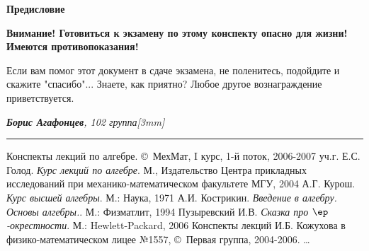 {
 \renewcommand{\baselinestretch}{1.25}
 
 \bfseries\Large Предисловие\par\bigskip
 \mdseries\normalsize
 
 


\vskip10mm
\begin{center}
{\color{red}\bf Внимание! Готовиться к экзамену по этому конспекту опасно
  для жизни! Имеются противопоказания!}
\end{center} 

\vskip20mm
\begin{flushright}
Если вам помог этот документ в сдаче экзамена, не поленитесь, подойдите и скажите "спасибо"... 
Знаете, как приятно? Любое другое вознаграждение приветствуется.
\end{flushright}
 
 \begin{flushright}
 \emph{{\bfseries Борис Агафонцев}, 102 группа[3mm]}
 \end{flushright}
}
 
 \hrule
 
 \begin{thebibliography}{books}
    Конспекты лекций по алгебре. \copyright\, МехМат, I курс, 1-й поток, 2006-2007 уч.г.
    Е.С. Голод. \emph{Курс лекций по алгебре}. М., Издательство Центра прикладных исследований при механико-математическом факультете МГУ, 2004
    А.Г. Курош. \emph{Курс высшей алгебры}. М.: Наука, 1971
    А.И. Кострикин. \emph{Введение в алгебру. Основы алгебры.}. М.: Физматлит, 1994
    Пузыревский И.В. \emph{Сказка про $\ep$-окрестности}. М.: Hewlett-Packard, 2006
    Конспекты лекций И.Б. Кожухова в физико-математическом лицее №1557, \copyright\, Первая группа, 2004-2006.
   \dots

 \end{thebibliography}
 
 \vskip10mm
\dmvntrail

\markboth{}{}

\newpage
